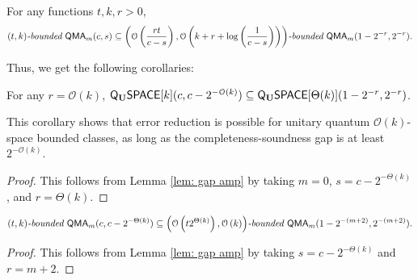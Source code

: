 \documentclass[a4paper,UKenglish]{lipics-v2016}
\newcommand\QMA{{\sf{QMA}}}
\newcommand\bddQMA[5]{{\left(#1,#2\right)}\textit{-bounded }\QMA_{#3}(#4,#5)}
\newcommand{\classfont}{\sf}
\newcommand{\Unitary}{\mathbf{U}}
\newcommand{\unitaryQSPACE}[3]{{\classfont{Q}_\Unitary\classfont{SPACE}}[#1](#2,#3)}
\newcommand\bigoh{\mathcal{O}}
\begin{document}
\begin{lemma} \label{lem: gap amp}
For any functions $t,k,r>0$, 
\[
\bddQMA{t}{k}{m}{c}{s}\subseteq\bddQMA{\mathcal{O}\left(\frac{rt}{c-s}\right)}{\mathcal{O}\left(k+r+\log\left(\frac{1}{c-s}\right)\right)}{m}{1-2^{-r}}{2^{-r}}.
\]
\end{lemma}


Thus, we get the following corollaries:
\begin{corollary} \label{obvious2} For any $r = \mathcal{O}(k)$,
$
\unitaryQSPACE{k}{c}{c-2^{-\bigoh (k)}} \subseteq
\unitaryQSPACE{\Theta(k)}{1-2^{-r}}{2^{-r}}$.
\end{corollary}
This corollary shows that error reduction is possible for unitary quantum $\bigoh(k)$-space bounded classes, as long as the completeness-soundness gap is at least $2^{-\bigoh (k)}$.
\begin{proof}
This follows from Lemma \ref{lem: gap amp} by taking $m=0$, $s = c-2^{-\Theta(k)}$, and $r = \Theta(k)$.
\end{proof}
\begin{corollary}\label{obvious1}
\[
\bddQMA{t}{k}{m}{c}{c-2^{-\Theta(k)}}\subseteq\bddQMA{\mathcal{O}\left(t2^{\Theta(k)}\right)}{\mathcal{O}\left(k\right)}{m}{1-2^{-(m+2)}}{2^{-(m+2)}}.
\]
\end{corollary}
\begin{proof}
This follows from Lemma \ref{lem: gap amp} by taking $s = c-2^{-\Theta(k)}$ and $r = m+2$.
\end{proof}
\end{document}
